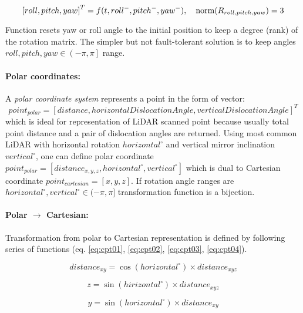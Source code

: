 \begin{equation}
    \left [ roll, pitch , yaw \right ]^T = f(t,roll^-,pitch^-,yaw^-), \quad \textnormal{norm}(R_{roll,pitch, yaw})=3
\end{equation}


\noindent Function resets yaw or roll angle to the initial position to keep a degree (rank) of the rotation matrix. The simpler but not fault-tolerant solution is to keep angles $roll,pitch,yaw \in \left (  -\pi,\pi\right ]$ range.


\paragraph{Polar coordinates:} A \emph{polar coordinate system} represents a point in the form of vector:
\begin{equation*}
    point_{polar}=[distance, horizontal Dislocation Angle, vertical Dislocation Angle]^T
\end{equation*}
which is ideal for representation of LiDAR scanned point because usually total point distance and a pair of dislocation angles are returned. Using most common LiDAR with horizontal rotation $horizontal^\circ$ and vertical mirror inclination $vertical^\circ$, one can define polar coordinate $point_{polar} = [distance_{x,y,z},horizontal^\circ,vertical^\circ]$ which is dual to Cartesian coordinate $point_{cartesian} = [x,y,z]$. If rotation angle  ranges are $horizontal^\circ,vertical^\circ\in(-\pi,\pi]$ transformation function is a bijection.

\paragraph{Polar $\to$ Cartesian:} Transformation from polar to Cartesian representation is defined by following series of functions (eq. \ref{eq:cpt01}, \ref{eq:cpt02}, \ref{eq:cpt03}, \ref{eq:cpt04}).

\begin{equation}\label{eq:cpt01}
    distance_{xy} = \cos(horizontal^\circ)\times distance_{xyz}
\end{equation}

\begin{equation}\label{eq:cpt02}
    z = \sin(hirizontal^\circ)\times distance_{xyz}
\end{equation}

\begin{equation}\label{eq:cpt03}
    y = \sin(horizontal^\circ)\times distance_{xy}
\end{equation}

